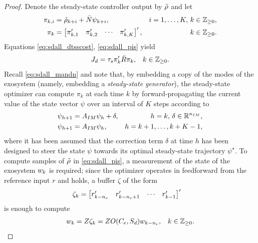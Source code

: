 \begin{proof}
  Denote the steady-state controller output by $\tilde{\rho}$ and let
  \begin{subequations}
    \label{eq:sdall_pis}
    \begin{align}
      \pi_{k,i} &= \tilde{\rho}_{k+i} + \bar{N}\psi_{k+i}, & i=1,\dotsc,K,\,k\in\mathbb{Z}_{\geq 0},\\
      \pi_k &= \begin{bmatrix}\pi_{k,1}' & \pi_{k,2}' & \cdots & \pi_{k,K}'\end{bmatrix}', & k\in\mathbb{Z}_{\geq 0}.
    \end{align}
  \end{subequations}
  Equations \eqref{eq:sdall_dtsscost}, \eqref{eq:sdall_pis} yield
  \begin{align}
    \label{eq:sdall_kroncost}
    J_d &= \tau_s\pi_k'\bar{R}\pi_k, & k\in\mathbb{Z}_{\geq 0}.
  \end{align}
  Recall \eqref{eq:sdall_mandn} and note that, by embedding a copy of the modes of the exosystem (namely, embedding a \emph{steady-state generator}), the steady-state optimizer can compute $\pi_k$ at each time $k$ by forward-propagating the current value of the state vector $\psi$ over an interval of $K$ steps according to
  \begin{subequations}
    \label{eq:sdall_ssoptpred}
    \begin{align}
      \psi_{h+1} &= A_{IM}\psi_h + \delta, & h = k,\,\delta\in\mathbb{R}^{n_{IM}},\\
      \psi_{h+1} &= A_{IM}\psi_h, & h = k+1,\dotsc,k+K-1,
    \end{align}
  \end{subequations}
  where it has been assumed that the correction term $\delta$ at time $h$ has been designed to steer the state $\psi$ towards its optimal steady-state trajectory $\psi^\star$. To compute samples of $\tilde{\rho}$ in \eqref{eq:sdall_pis}, a measurement of the state of the exosystem $w_k$ is required; since the optimizer operates in feedforward from the reference input $r$ and  holds, a buffer $\zeta$ of the form
  \begin{align}
    \label{eq:sdall_zeta}
    \zeta_k &= \begin{bmatrix}r_{k-{n_e}}' & r_{k-{n_e}+1}' & \cdots & r_{k-1}'\end{bmatrix}'
  \end{align}
  is enough to compute
  \begin{align}
    \label{eq:sdall_xirec}
    \bbexostate_k &= Z\zeta_k = ZO(\exooutmat,\dexodynmat)\bbexostate_{k-\bbexostatedim}, & k\in\Z_{\geq 0}.

\end{align}
\end{proof}
